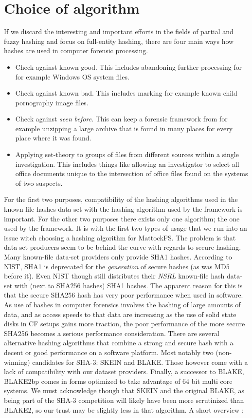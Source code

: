 \section{Choice of algorithm}
If we discard the interesting and important efforts in the fields of partial and fuzzy hashing and focus on full-entity hashing, there are four main ways how hashes are used in computer forensic processing.
\begin{itemize}
\item Check against known good. This includes abandoning further processing for for example Windows OS system files.
\item Check against known bad. This includes marking for example known child pornography image files.
\item Check against \emph{seen before}. This can keep a forensic framework from for example unzipping a large archive that is found in many places for every place where it was found.
\item Applying set-theory to groups of files from different sources within a single investigation. This includes things like allowing an investigator to select all office documents unique to the intersection of office files found on the systems of two suspects.
\end{itemize}
For the first two purposes, compatibility of the hashing algorithms used in the known file hashes data set with the hashing algorithm used by the framework is important. For the other two purposes there exists only one algorithm; the one used by the framework. It is with the first two types of usage that we run into an issue witch choosing a hashing algorithm for MattockFS. The problem is that data-set producers seem to be behind the curve with regards to secure hashing. Many known-file data-set providers only provide SHA1 hashes. According to NIST, SHA1 is deprecated for the \emph{generation} of secure hashes (as was MD5 before it). Even NIST though still distributes their \emph{NSRL} known-file hash data-set with (next to SHA256 hashes) SHA1 hashes.  The apparent reason for this is that the secure SHA256 hash has very poor performance when used in software. As use of hashes in computer forensics involves the hashing of large amounts of data, and as access speeds to that data are increasing as the use of solid state disks in CF setups gains more traction, the poor performance of the more secure SHA256 becomes a serious performance consideration. There are several alternative hashing algorithms that combine a strong and secure hash with a decent or good performance on a software platform. Most notably two (non-winning) candidates for SHA-3: SKEIN and BLAKE. Those however come with a lack of compatibility with our dataset providers. Finally, a successor to BLAKE, BLAKE2bp comes in forms optimized to take advantage of 64 bit multi core systems. We must acknowledge though that SKEIN and the original BLAKE, as being part of the SHA-3 competition will likely have been more scrutinized than BLAKE2, so our trust may be slightly less in that algorithm. A short overview :
